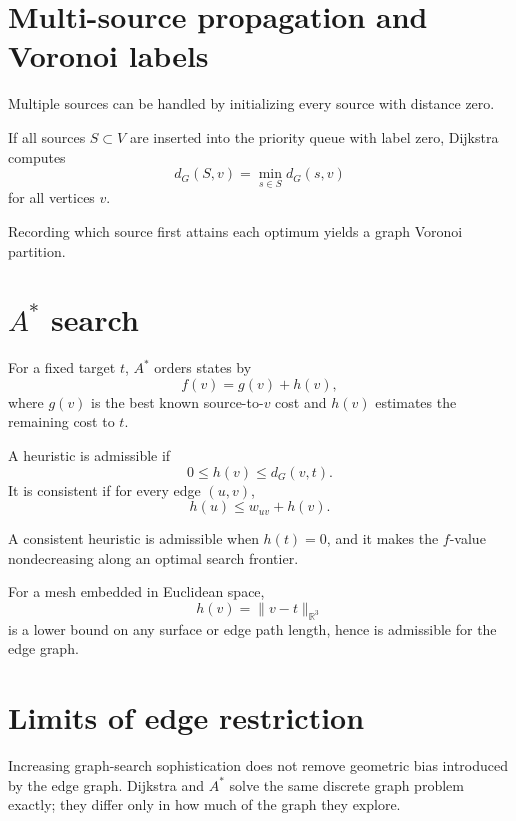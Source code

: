 \section{Multi-source propagation and Voronoi labels}

Multiple sources can be handled by initializing every source with distance zero.

\begin{proposition}\label{prop:vii39-multisource}
If all sources \(S\subset V\) are inserted into the priority queue with label
zero, Dijkstra computes
\[
d_G(S,v)=\min_{s\in S}d_G(s,v)
\]
for all vertices \(v\).
\end{proposition}

Recording which source first attains each optimum yields a graph Voronoi
partition.

\section{\(A^\ast\) search}

For a fixed target \(t\), \(A^\ast\) orders states by
\[
f(v)=g(v)+h(v),
\]
where \(g(v)\) is the best known source-to-\(v\) cost and \(h(v)\) estimates the
remaining cost to \(t\).

\begin{definition}\label{def:vii39-astar}
A heuristic is admissible if
\[
0\le h(v)\le d_G(v,t).
\]
It is consistent if for every edge \((u,v)\),
\[
h(u)\le w_{uv}+h(v).
\]
\end{definition}

A consistent heuristic is admissible when \(h(t)=0\), and it makes the \(f\)-value
nondecreasing along an optimal search frontier.

\begin{example}\label{ex:vii39-chord}
For a mesh embedded in Euclidean space,
\[
h(v)=\|v-t\|_{\mathbb R^3}
\]
is a lower bound on any surface or edge path length, hence is admissible for the
edge graph.
\end{example}

\section{Limits of edge restriction}

Increasing graph-search sophistication does not remove geometric bias introduced
by the edge graph.  Dijkstra and \(A^\ast\) solve the same discrete graph problem
exactly; they differ only in how much of the graph they explore.

